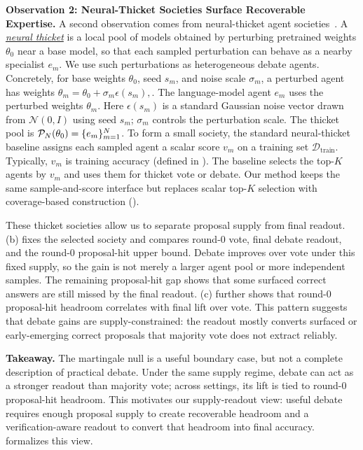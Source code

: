 \textbf{Observation 2: Neural-Thicket Societies Surface Recoverable Expertise.}
A second observation comes from neural-thicket agent societies~\citep{gan2026neuralthicketsdiversetask}.
A \underline{\emph{neural thicket}} is a local pool of models obtained by perturbing pretrained
weights $\theta_0$ near a base model, so that each sampled perturbation can
behave as a nearby specialist $e_m$.
We use such perturbations as heterogeneous debate agents. Concretely, for base
weights $\theta_0$, seed $s_m$, and noise scale $\sigma_m$, a perturbed agent has weights
$
\theta_m=\theta_0+\sigma_m\epsilon(s_m),
$.
The language-model agent $e_m$ uses the perturbed weights $\theta_m$. Here
$\epsilon(s_m)$ is a standard Gaussian noise vector drawn from
$\mathcal N(0,I)$ using seed $s_m$; $\sigma_m$ controls the perturbation
scale.
The thicket pool is
$
{\mathcal{P}}_N(\theta_0)=\{e_m\}_{m=1}^N
$.
To form a small society, the standard neural-thicket baseline assigns each
sampled agent a scalar score $v_m$ on a training set
$\mathcal D_{\mathrm{train}}$.
Typically, $v_m$ is training accuracy (defined in ).
The baseline selects the top-$K$ agents by $v_m$ and uses them for thicket vote
or debate. Our method keeps the same sample-and-score interface but replaces
scalar top-$K$ selection with coverage-based construction ().

These thicket societies allow us to separate proposal supply from final readout.
(b) fixes the selected society and compares
round-0 vote, final debate readout, and the round-0 proposal-hit upper bound.
Debate improves over vote under this fixed supply, so the gain is not merely a
larger agent pool or more independent samples. The remaining proposal-hit gap
shows that some surfaced correct answers are still missed by the final readout.
(c) further shows that round-0 proposal-hit
headroom correlates with final lift over vote. This pattern suggests that
debate gains are supply-constrained: the readout mostly converts surfaced or
early-emerging correct proposals that majority vote does not extract reliably.

\textbf{Takeaway.}
The martingale null is a useful boundary case, but not a
complete description of practical debate. Under the same supply regime, debate
can act as a stronger readout than majority vote; across settings, its lift is
tied to round-0 proposal-hit headroom. This motivates our supply-readout view:
useful debate requires enough proposal supply to create recoverable headroom
and a verification-aware readout to convert that headroom into final accuracy.
 formalizes this view.

